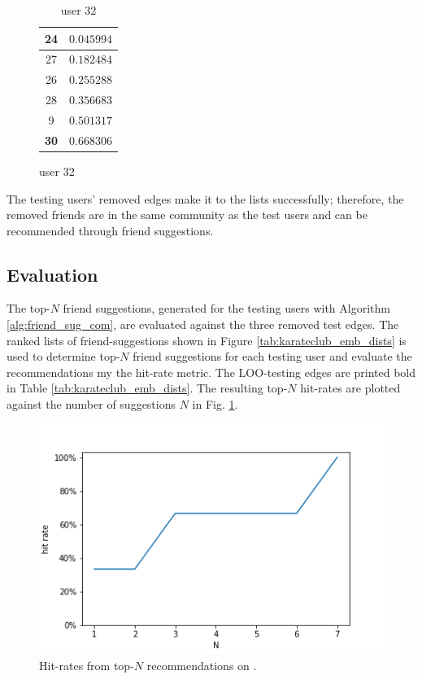 \documentclass[conference]{IEEEtran}
\begin{document}
\begin{table}
\begin{subfigure}{.4\textwidth}
\begin{tabular}{ c | r }
            \hline
            24          & $0.045994$ \\
            \hline
            27          & $0.182484$ \\
            \hline
            26          & $0.255288$ \\
            \hline
            28          & $0.356683$ \\
            \hline
            9           & $0.501317$ \\
            \hline
            \textbf{30} & $0.668306$ \\
        \end{tabular}
        \caption{user 32}
    \end{subfigure}
\end{table}

The testing users' removed edges make it to the lists successfully; therefore, the removed friends are in the same community as the test users and can be recommended through friend suggestions.

\subsection{Evaluation}

The top-$N$ friend suggestions, generated for the testing users with Algorithm \ref{alg:friend_sug_com}, are evaluated against the three removed test edges.
The ranked lists of friend-suggestions shown in Figure \ref{tab:karateclub_emb_dists} is used to determine top-$N$ friend suggestions for each testing user and evaluate the recommendations my the hit-rate metric. The LOO-testing edges are printed bold in Table \ref{tab:karateclub_emb_dists}. The resulting top-$N$ hit-rates are plotted against the number of suggestions $N$ in Fig. \ref{fig:karateclub_hitrates}.

\begin{figure}
    \centering
    \includegraphics[width=.4\textwidth]{images/karateclub/hit_rates.png}
    \caption{Hit-rates from top-$N$ recommendations on .}
    \label{fig:karateclub_hitrates}
\end{figure}
\end{document}
